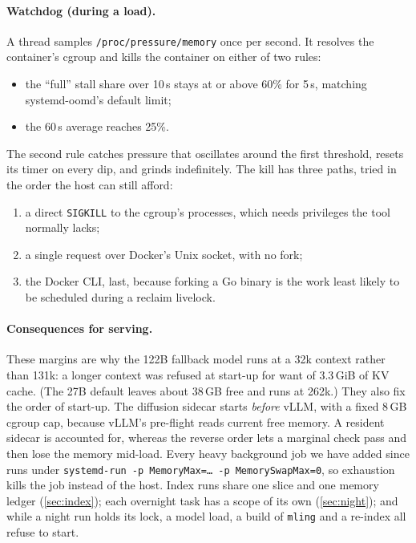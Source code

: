 \documentclass[11pt]{article}
\newcommand{\code}[1]{\texttt{#1}}
\begin{document}
\paragraph{Watchdog (during a load).} A thread samples \code{/proc/pressure/memory} once per second.
It resolves the container's cgroup and kills the container on either of two rules:
\begin{itemize}
  \item the ``full'' stall share over 10\,s stays at or above 60\% for 5\,s, matching systemd-oomd's
    default limit;
  \item the 60\,s average reaches 25\%.
\end{itemize}
The second rule catches pressure that oscillates around the first threshold, resets its timer on
every dip, and grinds indefinitely. The kill has three paths, tried in the order the host can still
afford:
\begin{enumerate}
  \item a direct \code{SIGKILL} to the cgroup's processes, which needs privileges the tool normally
    lacks;
  \item a single request over Docker's Unix socket, with no fork;
  \item the Docker CLI, last, because forking a Go binary is the work least likely to be scheduled
    during a reclaim livelock.
\end{enumerate}

\paragraph{Consequences for serving.} These margins are why the 122B fallback model runs at a 32k
context rather than 131k: a longer context was refused at start-up for want of 3.3\,GiB of KV
cache. (The 27B default leaves about 38\,GB free and runs at 262k.) They also
fix the order of start-up. The diffusion sidecar starts \emph{before} vLLM, with a fixed 8\,GB
cgroup cap, because vLLM's pre-flight reads current free memory. A resident sidecar is accounted
for, whereas the reverse order lets a marginal check pass and then lose the memory mid-load.
Every heavy background job we have added since runs under
\code{systemd-run -p MemoryMax=\ldots{} -p MemorySwapMax=0}, so exhaustion kills the job instead
of the host. Index runs share one slice and one memory ledger (\cref{sec:index}); each overnight
task has a scope of its own (\cref{sec:night}); and while a night run holds its lock, a model
load, a build of \code{mling} and a re-index all refuse to start.
\end{document}
